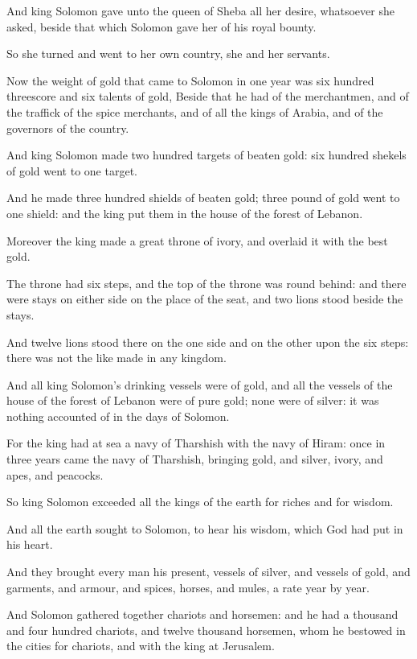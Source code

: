 \Verse And king Solomon gave unto the queen of Sheba all her desire, whatsoever she asked, beside that which Solomon gave her of his royal bounty.

So she turned and went to her own country, she and her servants.

\Verse Now the weight of gold that came to Solomon in one year was six hundred threescore and six talents of gold, \Verse Beside that he had of the merchantmen, and of the traffick of the spice merchants, and of all the kings of Arabia, and of the governors of the country.

\Verse And king Solomon made two hundred targets of beaten gold: six hundred shekels of gold went to one target.

\Verse And he made three hundred shields of beaten gold; three pound of gold went to one shield: and the king put them in the house of the forest of Lebanon.

\Verse Moreover the king made a great throne of ivory, and overlaid it with the best gold.

\Verse The throne had six steps, and the top of the throne was round behind: and there were stays on either side on the place of the seat, and two lions stood beside the stays.

\Verse And twelve lions stood there on the one side and on the other upon the six steps: there was not the like made in any kingdom.

\Verse And all king Solomon's drinking vessels were of gold, and all the vessels of the house of the forest of Lebanon were of pure gold; none were of silver: it was nothing accounted of in the days of Solomon.

\Verse For the king had at sea a navy of Tharshish with the navy of Hiram: once in three years came the navy of Tharshish, bringing gold, and silver, ivory, and apes, and peacocks.

\Verse So king Solomon exceeded all the kings of the earth for riches and for wisdom.

\Verse And all the earth sought to Solomon, to hear his wisdom, which God had put in his heart.

\Verse And they brought every man his present, vessels of silver, and vessels of gold, and garments, and armour, and spices, horses, and mules, a rate year by year.

\Verse And Solomon gathered together chariots and horsemen: and he had a thousand and four hundred chariots, and twelve thousand horsemen, whom he bestowed in the cities for chariots, and with the king at Jerusalem.

